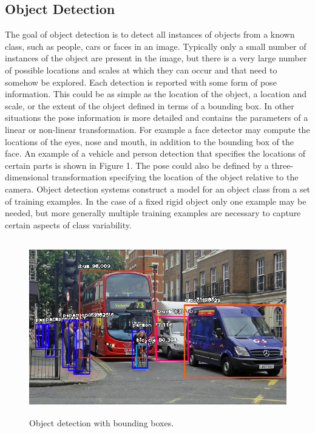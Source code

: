 \subsection{Object Detection}
 The goal of object detection is to detect all instances of objects from a known class, such as people, cars or faces in an image. Typically only a small number of instances of the object are present in the image, but there is a very large number of possible locations and scales at which they can occur and that need to somehow be explored.
Each detection is reported with some form of pose information. This could be as simple as the location of the object, a location and scale, or the extent of the object defined in terms of a bounding box. In other situations the pose information is more detailed and contains the parameters of a linear or non-linear transformation. For example a face detector may compute the locations of the
eyes, nose and mouth, in addition to the bounding box of the face. An example of a vehicle and person detection that specifies the locations of certain parts is shown in Figure 1. The pose could also be defined by a three-dimensional transformation specifying the location of the object relative to the camera.
Object detection systems construct a model for an object class from a set of
training examples. In the case of a fixed rigid object only one example may be
needed, but more generally multiple training examples are necessary to capture
certain aspects of class variability.
\begin{figure}[H]
  \centering
  \includegraphics[height=3in]{images/object_det.jpeg}
   \caption{Object detection with bounding boxes.}
\end{figure}

